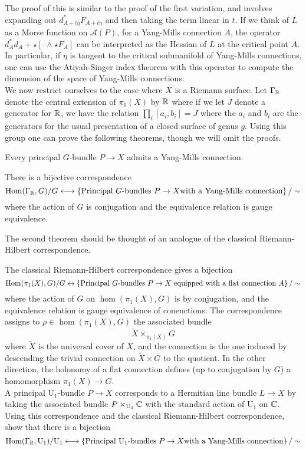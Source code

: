 %
The proof of this is similar to the proof of the first variation,
and involves expanding out $d^*_{A+t\eta}F_{A+t\eta}$ and then taking
the term linear in $t$. If we think of $L$ as a Morse function on
$\mathscr{A}(P)$, for a Yang-Mills connection $A$, the operator
$d^*_Ad_A + \star[\cdot\wedge\star F_A]$ can be interpreted as the Hessian
of $L$ at the critical point $A$. In particular, if $\eta$ is
tangent to the critical submanifold of Yang-Mills connections,
one can use the Atiyah-Singer index theorem with this operator to
compute the dimension of the space of Yang-Mills connections. \\

We now restrict ourselves to the case where $X$ is a Riemann surface. Let
$\Gamma_{\mathbb{R}}$ denote the central extension of $\pi_1(X)$ by
$\mathbb{R}$ where if we let $J$ denote a generator for $\mathbb{R}$, we have the
relation $\prod_{i}[a_i,b_i] = J$ where the $a_i$ and $b_i$ are the generators
for the usual presentation of a closed surface of genus $g$. Using this
group one can prove the following theorems, though we will omit the proofs.
%
\begin{thm}
Every principal $G$-bundle $P \to X$ admits a Yang-Mills connection.
\end{thm}
%
\begin{thm}
There is a bijective correspondence
\[
\mathrm{Hom}(\Gamma_{\mathbb{R}},G)/G \longleftrightarrow\left\lbrace \text{Principal }G\text{-bundles }
P \to X \text{with a Yang-Mills connection} \right\rbrace/\sim
\]
where the action of $G$ is conjugation and the equivalence relation is
gauge equivalence.
\end{thm}
%
The second theorem should be thought of an analogue of the classical
Riemann-Hilbert correspondence.
%
\begin{exer}
The classical Riemann-Hilbert correspondence gives a bijection
\[
\mathrm{Hom}(\pi_1(X),G)/G \leftrightarrow \left\lbrace \text{Principal }G\text{-bundles } P \to X
\text{ equipped with a flat connection } A \right\rbrace/\sim
\]
where the action of $G$ on $\hom(\pi_1(X),G)$ is by conjugation, and
the equivalence relation is gauge equivalence of conenctions.
The correspondence assigns to $\rho \in \hom(\pi_1(X),G)$ the associated bundle
\[
\widetilde{X} \times_{\pi_1(X)} G
\]
where $\widetilde{X}$ is the universal cover of $X$, and the connection
is the one induced by descending the trivial connection on $\widetilde{X} \times G$
to the quotient. In the other direction, the holonomy of a flat connection
defines (up to conjugation by $G$) a homomorphism $\pi_1(X) \to G$. \\

A principal $\mathrm{U}_1$-bundle $P \to X$ corresponds to a Hermitian line bundle
$L \to X$ by taking the associated bundle $P\times_{\mathrm{U}_1}\mathbb{C}$ with
the standard action of $\mathrm{U}_1$ on $\mathbb{C}$. Using this correspondence
and the classical Riemann-Hilbert correspondence, show that there is a bijection
\[
\mathrm{Hom}(\Gamma_{\mathbb{R}},\mathrm{U}_1)/\mathrm{U}_1
\longleftrightarrow\left\lbrace \text{Principal }\mathrm{U}_1\text{-bundles }
P \to X \text{with a Yang-Mills connection} \right\rbrace/\sim
\]
\end{exer}
